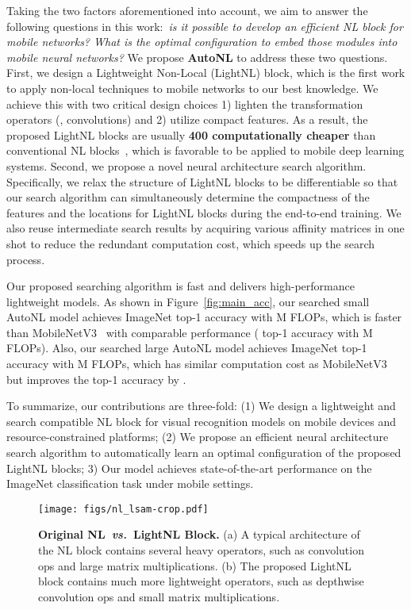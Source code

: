 \documentclass[10pt,twocolumn,letterpaper]{article}
\begin{document}
Taking the two factors aforementioned into account, we aim to answer the following questions in this work:~\emph{is it possible to develop an efficient NL block for mobile networks? What is the optimal configuration to embed those modules into mobile neural networks?} We propose \textbf{AutoNL} to address these two questions. First, we design a Lightweight Non-Local (LightNL) block, which is the first work to apply non-local techniques to mobile networks to our best knowledge. We achieve this with two critical design choices 1) lighten the transformation operators (\eg,  convolutions) and 2) utilize compact features. As a result, the proposed LightNL blocks are usually \textbf{400 computationally cheaper} than conventional NL blocks~\cite{wang2018non}, which is favorable to be applied to mobile deep learning systems.
Second, we propose a novel neural architecture search algorithm. Specifically, we relax the structure of LightNL blocks to be differentiable so that our search algorithm can simultaneously determine the compactness of the features and the locations for LightNL blocks during the end-to-end training. We also reuse intermediate search results by acquiring various affinity matrices in one shot to reduce the redundant computation cost, which speeds up the search process.


Our proposed searching algorithm is fast and delivers high-performance lightweight models. As shown in Figure~\ref{fig:main_acc}, our searched small AutoNL model achieves  ImageNet top-1 accuracy with M FLOPs, which is faster than MobileNetV3~\cite{howard2019searching} with comparable performance ( top-1 accuracy with M FLOPs). Also, our searched large AutoNL model achieves  ImageNet top-1 accuracy with M FLOPs, which has similar computation cost as MobileNetV3 but improves the top-1 accuracy by .

To summarize, our contributions are three-fold: (1) We design a lightweight and search compatible NL block for visual recognition models on mobile devices and resource-constrained platforms; (2) We propose an efficient neural architecture search algorithm to automatically learn an optimal configuration of the proposed LightNL blocks; 3) Our model achieves state-of-the-art performance on the ImageNet classification task under mobile settings.

\begin{figure*}[tb]
\centering
\texttt{[image: figs/nl\_lsam-crop.pdf]}
\caption{\textbf{Original NL~\emph{vs.}~LightNL Block.} (a) A typical architecture of the NL block contains several heavy operators, such as  convolution ops and large matrix multiplications. (b) The proposed LightNL block contains much more lightweight operators, such as depthwise convolution ops and small matrix multiplications.}
\label{fig:nl_lsam}
\vspace{-1em}
\end{figure*}
\end{document}
